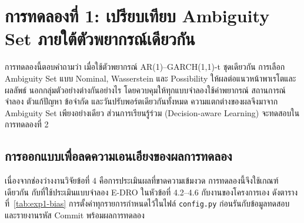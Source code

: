 
\section{การทดลองที่ 1: เปรียบเทียบ Ambiguity Set ภายใต้ตัวพยากรณ์เดียวกัน}
\label{sec:exp1}

การทดลองนี้ตอบคำถามว่า เมื่อใช้ตัวพยากรณ์ AR(1)--GARCH(1,1)-t ชุดเดียวกัน การเลือก
Ambiguity Set แบบ Nominal, Wasserstein และ Possibility ให้ผลต่อแนวหน้าพาเรโตและผลลัพธ์
นอกกลุ่มตัวอย่างต่างกันอย่างไร โดยควบคุมให้ทุกแบบจำลองใช้ค่าพยากรณ์ สถานการณ์จำลอง
ตัวแก้ปัญหา ข้อจำกัด และวันปรับพอร์ตเดียวกันทั้งหมด ความแตกต่างของผลจึงมาจาก Ambiguity
Set เพียงอย่างเดียว ส่วนการเรียนรู้ร่วม (Decision-aware Learning) จะทดสอบในการทดลองที่ 2

\subsection{การออกแบบเพื่อลดความเอนเอียงของผลการทดลอง}
\label{sec:exp1-bias}

เนื่องจากช่องว่างงานวิจัยข้อที่ 4 คือการประเมินผลที่ขาดความเข้มงวด การทดลองนี้จึงใช้เกณฑ์เดียวกัน
กับที่ใช้ประเมินแบบจำลอง E-DRO ในหัวข้อที่ 4.2--4.6 กับงานของโครงการเอง ดังตารางที่~\ref{tab:exp1-bias}
การตั้งค่าทุกรายการกำหนดไว้ในไฟล์ \texttt{config.py} ก่อนรันกับข้อมูลทดสอบ และรายงานรหัส
Commit พร้อมผลการทดลอง

